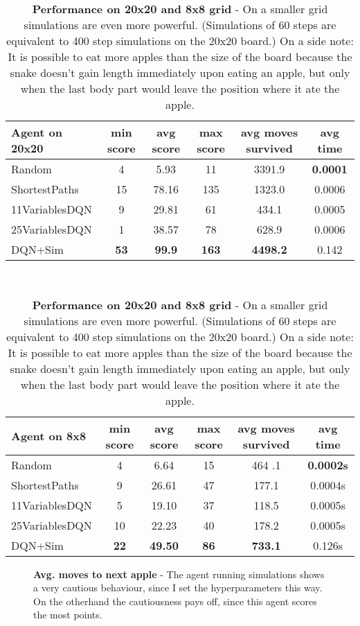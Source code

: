 \documentclass{article}
\begin{document}
	\begin{table}
	\centering
	\begin{tabular}{l|*{5}{c}}
		\hline
		\textbf{Agent on 20x20}              & min score & avg score & max score  & avg moves survived & avg  time\\
		\hline
		Random 					  & 4 & 5.93 & 11 & 3391.9 & \textbf{0.0001}\\
		ShortestPaths          & 15 & 78.16 & 135 &  1323.0 & 0.0006\\
		11VariablesDQN         & 9  & 29.81 & 61 & 434.1 & 0.0005\\
		25VariablesDQN        &  1  & 38.57   &  78 & 628.9&0.0006 \\
		DQN+Sim                 & \textbf{53}  &  \textbf{99.9}& \textbf{163}& \textbf{4498.2}&0.142\\
		\hline
	\end{tabular} \\
 	\bigskip
	\begin{tabular}{l|*{5}{c}}
		\hline
		\textbf{Agent on 8x8}              & min score & avg score & max score  & avg moves survived &avg time \\
		\hline
		Random 					  & 4 & 6.64 & 15 & 464 .1 & \textbf{0.0002s} \\
		ShortestPaths           & 9 & 26.61 & 47 & 177.1   & 0.0004s \\
		11VariablesDQN         & 5& 19.10 & 37 & 118.5& 0.0005s\\
		25VariablesDQN        & 10 &  22.23 & 40 & 178.2 & 0.0005s \\
		DQN+Sim                 & \textbf{22} & \textbf{49.50} & \textbf{86} & \textbf{733.1} & 0.126s \\
		\hline
	\end{tabular}
	
	\bigskip
	
	\caption{\textbf{Performance on 20x20 and 8x8 grid} - On a smaller grid simulations are even more powerful. (Simulations of 60 steps are equivalent to 400 step simulations on the 20x20 board.) On a side note: It is possible to eat more apples than the size of the board because the snake doesn't gain length immediately upon eating an apple, but only when the last body part would leave the position where it ate the apple.}
	\label{tab:performance}
\end{table}

\begin{figure}
	\centering
	\qquad
	\caption{\small \textbf{Avg. moves to next apple} - The agent running simulations shows a very cautious behaviour, since I set the hyperparameters this way. On the otherhand the cautiousness pays off, since this agent scores the most points.}
	\label{movesPerformance}
\end{figure} 
\end{document}

